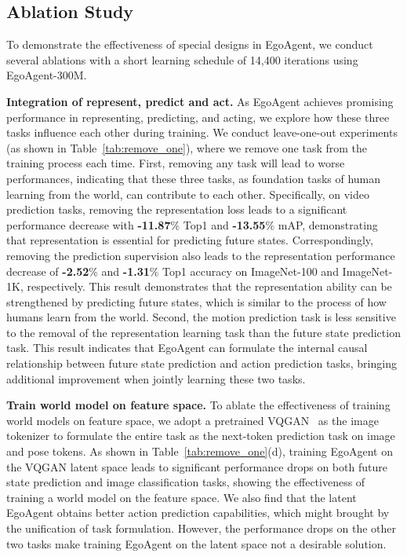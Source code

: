 \subsection{Ablation Study}

To demonstrate the effectiveness of special designs in EgoAgent, we conduct several ablations with a short learning schedule of 14,400 iterations using EgoAgent-300M.

\vspace{1.5mm}
\noindent\textbf{Integration of represent, predict and act.} As EgoAgent achieves promising performance in representing, predicting, and acting, we explore how these three tasks influence each other during training. We conduct leave-one-out experiments (as shown in Table~\ref{tab:remove_one}), where we remove one task from the training process each time. First, removing any task will lead to worse performances, indicating that these three tasks, as foundation tasks of human learning from the world, can contribute to each other. Specifically, on video prediction tasks, removing the representation loss leads to a significant performance decrease with \textbf{-11.87}\% Top1 and \textbf{-13.55}\% mAP, demonstrating that representation is essential for predicting future states. Correspondingly, removing the prediction supervision also leads to the representation performance decrease of \textbf{-2.52}\% and \textbf{-1.31}\% Top1 accuracy on ImageNet-100 and ImageNet-1K, respectively. This result demonstrates that the representation ability can be strengthened by predicting future states, which is similar to the process of how humans learn from the world. Second, the motion prediction task is less sensitive to the removal of the representation learning task than the future state prediction task. 
This result indicates that EgoAgent can formulate the internal causal relationship between future state prediction and action prediction tasks, bringing additional improvement when jointly learning these two tasks.

\vspace{1.5mm}
\noindent\textbf{Train world model on feature space.} To ablate the effectiveness of training world models on feature space, we adopt a pretrained VQGAN~\cite{esser2021taming} as the image tokenizer to formulate the entire task as the next-token prediction task on image and pose tokens. As shown in Table~\ref{tab:remove_one}(d), training EgoAgent on the VQGAN latent space leads to significant performance drops on both future state prediction and image classification tasks, showing the effectiveness of training a world model on the feature space. We also find that the latent EgoAgent obtains better action prediction capabilities, which might brought by the unification of task formulation. However, the performance drops on the other two tasks make training EgoAgent on the latent space not a desirable solution.

